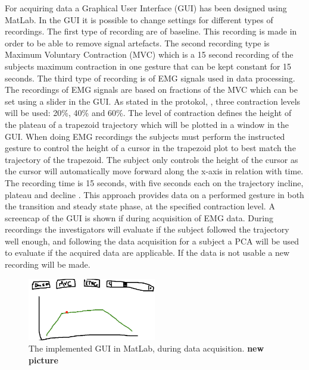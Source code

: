 For acquiring data a Graphical User Interface (GUI) has been designed using MatLab. In the GUI it is possible to change settings for different types of recordings. The first type of recording are of baseline. This recording is made in order to be able to remove signal artefacts. The second recording type is Maximum Voluntary Contraction (MVC) which is a 15 second recording of the subjects maximum contraction in one gesture that can be kept constant for 15 seconds. The third type of recording is of EMG signals used in data processing. The recordings of EMG signals are based on fractions of the MVC which can be set using a slider in the GUI. As stated in the protokol, , three contraction levels will be used: 20\%, 40\% and 60\%. The level of contraction defines the height of the plateau of a trapezoid trajectory which will be plotted in a window in the GUI. When doing EMG recordings the subjects must perform the instructed gesture to control the height of a cursor in the trapezoid plot to best match the trajectory of the trapezoid. The subject only controls the height of the cursor as the cursor will automatically move forward along the x-axis in relation with time. The recording time is 15 seconds, with five seconds each on the trajectory incline, plateau and decline . This approach provides data on a performed gesture in both the transition and steady state phase, at the specified contraction level. A screencap of the GUI is shown if  during acquisition of EMG data. 
During recordings the investigators will evaluate if the subject followed the trajectory well enough, and following the data acquisition for a subject a PCA will be used to evaluate if the acquired data are applicable. If the data is not usable a new recording will be made. 

\begin{figure}[H] 
	\includegraphics[width=0.5\textwidth]{figures/pMethods/GUIplot}
	\caption{The implemented GUI in MatLab, during data acquisition. \textbf{new picture}}
	\label{fig:GUIplot}
\end{figure}
